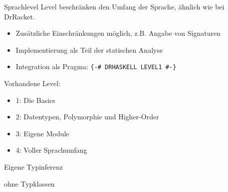 \begin{frame}{Sprachlevel}
	Level beschränken den Umfang der Sprache, ähnlich wie bei DrRacket.
	\begin{itemize}
		\item Zusätzliche Einschränkungen  möglich, z.B. Angabe von Signaturen
		\item Implementierung als Teil der statischen Analyse
		\item Integration als Pragma: \texttt{\{-\# DRHASKELL LEVEL1 \#-\}}
	\end{itemize}
	Vorhandene Level: \par
	\begin{minipage}[T]{.55 \textwidth}
		\begin{itemize}
			\item 1: Die Basics
			\item 2: Datentypen, Polymorphie und Higher-Order
			\item 3: Eigene Module
			\item 4: Voller Sprachumfang
		\end{itemize}
	\end{minipage}
	\begin{minipage}[T]{.4 \textwidth}
			\scalebox{6}{\}} Eigene Typinferenz \par \hspace{32px} ohne Typklassen
	\end{minipage}
\end{frame}